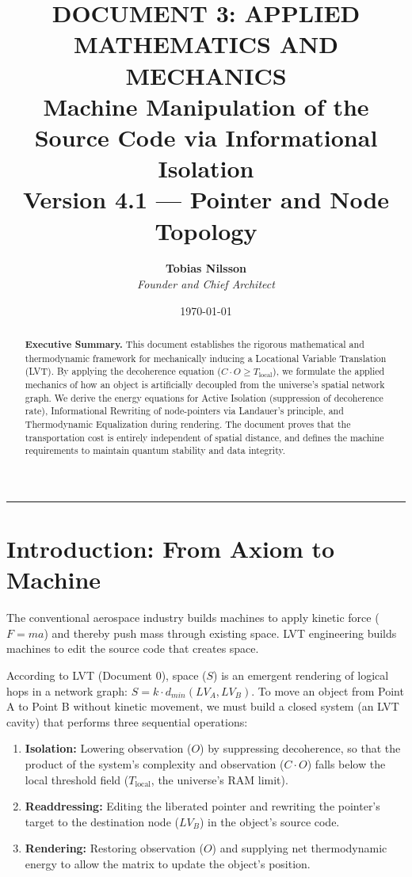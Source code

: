 \documentclass[12pt,a4paper]{article}
\title{\Huge
\textbf{DOCUMENT 3: APPLIED MATHEMATICS AND MECHANICS} \\ \large Machine Manipulation of the Source Code via Informational Isolation \\[0.5em]
\normalsize Version 4.1 --- Pointer and Node Topology}
\author{\textbf{Tobias Nilsson} \\ \textit{Founder and Chief Architect}}
\date{\today}
\begin{document}
\maketitle

\vspace{-1em}
\begin{abstract}
\noindent
\textbf{Executive Summary.} This document establishes the rigorous mathematical and thermodynamic framework for mechanically inducing a Locational Variable Translation (LVT). By applying the decoherence equation ($C \cdot O \geq T_{\mathrm{local}}$), we formulate the applied mechanics of how an object is artificially decoupled from the universe's spatial network graph. We derive the energy equations for Active Isolation (suppression of decoherence rate), Informational Rewriting of node-pointers via Landauer's principle, and Thermodynamic Equalization during rendering. The document proves that the transportation cost is entirely independent of spatial distance, and defines the machine requirements to maintain quantum stability and data integrity.
\end{abstract}

\vspace{1em}
\hrule
\vspace{1em}

\tableofcontents
\clearpage

\section{Introduction: From Axiom to Machine}

The conventional aerospace industry builds machines to apply kinetic force ($F = ma$) and thereby push mass through existing space. LVT engineering builds machines to edit the source code that creates space.

According to LVT (Document 0), space ($S$) is an emergent rendering of logical hops in a network graph: $S = k \cdot d_{min}(LV_A, LV_B)$. To move an object from Point A to Point B without kinetic movement, we must build a closed system (an LVT cavity) that performs three sequential operations:
\begin{enumerate}
    \item \textbf{Isolation:} Lowering observation ($O$) by suppressing decoherence, so that the product of the system's complexity and observation ($C \cdot O$) falls below the local threshold field ($T_{\mathrm{local}}$, the universe's RAM limit).
    \item \textbf{Readdressing:} Editing the liberated pointer and rewriting the pointer's target to the destination node ($LV_B$) in the object's source code.
    \item \textbf{Rendering:} Restoring observation ($O$) and supplying net thermodynamic energy to allow the matrix to update the object's position.
\end{enumerate}
\end{document}
